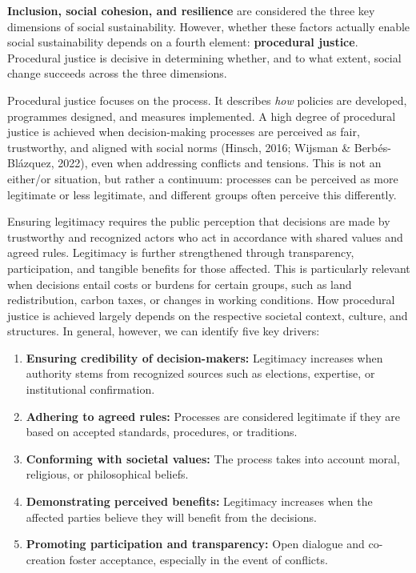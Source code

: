 \documentclass[
  a4paper,
  openany]{book}
\begin{document}
\textbf{Inclusion, social cohesion, and resilience} are considered the
three key dimensions of social sustainability. However, whether these
factors actually enable social sustainability depends on a fourth
element: \textbf{procedural justice}. Procedural justice is decisive in
determining whether, and to what extent, social change succeeds across
the three dimensions.

Procedural justice focuses on the process. It describes \emph{how}
policies are developed, programmes designed, and measures implemented. A
high degree of procedural justice is achieved when decision-making
processes are perceived as fair, trustworthy, and aligned with social
norms (Hinsch, 2016; Wijsman \& Berbés-Blázquez, 2022), even when
addressing conflicts and tensions. This is not an either/or situation,
but rather a continuum: processes can be perceived as more legitimate or
less legitimate, and different groups often perceive this differently.

Ensuring legitimacy requires the public perception that decisions are
made by trustworthy and recognized actors who act in accordance with
shared values and agreed rules. Legitimacy is further strengthened
through transparency, participation, and tangible benefits for those
affected. This is particularly relevant when decisions entail costs or
burdens for certain groups, such as land redistribution, carbon taxes,
or changes in working conditions. How procedural justice is achieved
largely depends on the respective societal context, culture, and
structures. In general, however, we can identify five key drivers:

\begin{enumerate}
\def\labelenumi{\arabic{enumi}.}
\item
  \textbf{Ensuring credibility of decision-makers:} Legitimacy increases
  when authority stems from recognized sources such as elections,
  expertise, or institutional confirmation.
\item
  \textbf{Adhering to agreed rules:} Processes are considered legitimate
  if they are based on accepted standards, procedures, or traditions.
\item
  \textbf{Conforming with societal values:} The process takes into
  account moral, religious, or philosophical beliefs.
\item
  \textbf{Demonstrating perceived benefits:} Legitimacy increases when
  the affected parties believe they will benefit from the decisions.
\item
  \textbf{Promoting participation and transparency:} Open dialogue and
  co-creation foster acceptance, especially in the event of conflicts.
\end{enumerate}
\end{document}
